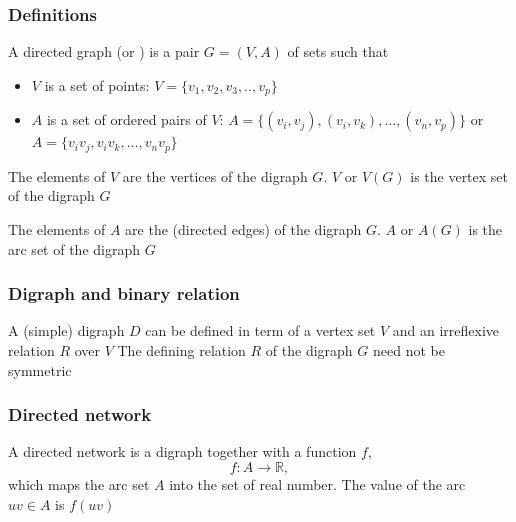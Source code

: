 \documentclass[aspectratio=169]{beamer}\usepackage[]{graphicx}\usepackage[]{xcolor}
\begin{document}
\begin{frame} \frametitle{Definitions} 
\begin{definition}[{Digraph}]
A directed graph (or ) is a pair $G=(V,A)$ of sets such that
\begin{itemize}
\item $V$ is a set of points:  $V=\{v_1,v_2,v_3,..,v_p\}$
\item $A$ is a set of ordered pairs of $V$: $A=\{(v_i,v_j),(v_i,v_k),\dots,(v_n,v_p)\}$ or $A=\{v_iv_j,v_iv_k,\dots,v_nv_p\}$
\end{itemize}
\end{definition}
\begin{definition}[{Vertex}]
The elements of $V$ are the vertices of the digraph $G$.
$V$ or $V(G)$ is the vertex set of the digraph $G$
\end{definition}
\begin{definition}[{Arc}]
The elements of $A$ are the  (directed edges) of the digraph $G$.
$A$ or $A(G)$ is the arc set of the digraph $G$
\end{definition}
\end{frame}



\begin{frame}\frametitle{Digraph and binary relation}
A (simple) digraph $D$ can be defined in term of a vertex set $V$ and an irreflexive relation $R$ over $V$
\vfill
The defining relation $R$ of the digraph $G$ need not be symmetric
\end{frame}


\begin{frame}\frametitle{Directed network}
\begin{definition}
A directed network is a digraph together with a function $f$,
\[
f: A \rightarrow \mathbb{R},
\]
which maps the arc set $A$ into the set of real number. 
The value of the arc $uv \in A$ is $f(uv)$
\end{definition}
\end{frame}



\end{document}
